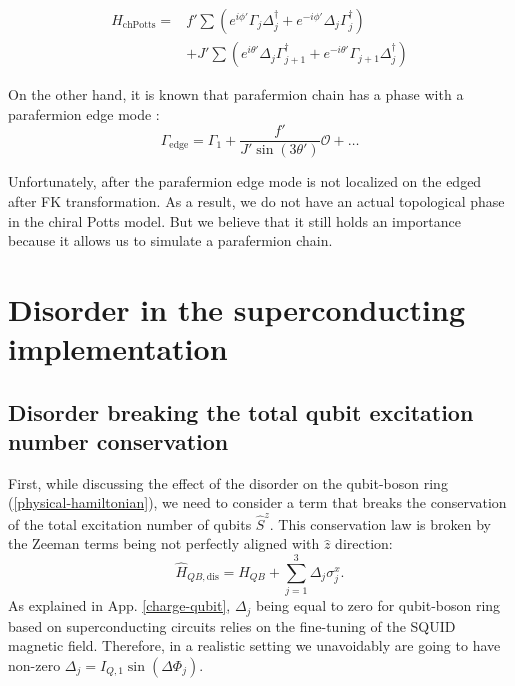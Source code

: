 \documentclass[reprint, aps, prx, amsmath, amssymb, longbibliography, superscriptaddress]{revtex4-2}
\begin{document}
\begin{equation}
\begin{aligned}
    H_{\text{chPotts}} = &f' \sum \left( e^{i\phi'} \Gamma_j \Delta_j^{\dagger} + e^{-i\phi'} \Delta_j \Gamma_j^{\dagger}\right) \\
    &+J' \sum \left(e^{i\theta'} \Delta_j \Gamma_{j+1}^{\dagger} + e^{-i\theta'} \Gamma_{j+1} \Delta_j^{\dagger}\right)
\end{aligned}
\end{equation}



On the other hand, it is known that parafermion chain has a phase with a parafermion edge mode  \cite{fendley_parafermionic_2012}:
\begin{equation}
\Gamma_{\text{edge}} = \Gamma_1 + \frac{f'}{J' \sin(3\theta')} \mathcal{O} + \dots
\end{equation}

Unfortunately, after the parafermion edge mode is not localized on the edged after FK transformation. As a result, we do not have an actual topological phase in the chiral Potts model. But we believe that it still holds an importance because it allows us to simulate a parafermion chain.


\section{Disorder in the superconducting implementation}
\subsection{Disorder breaking the total qubit excitation number conservation}


First, while discussing the effect of the disorder on the qubit-boson ring (\ref{physical-hamiltonian}), we need to consider a term that breaks the conservation of the total excitation number of qubits $\hat S^z$. This conservation law is broken by the Zeeman terms being not perfectly aligned with $\hat z$ direction:
\begin{equation}
    \hat H_{QB,\text{dis}} = \hat H_{QB} + \sum_{j=1}^3 \Delta_j \sigma_j^x.
\end{equation}
As explained in App. \ref{charge-qubit}, $\Delta_j$ being equal to zero for qubit-boson ring based on superconducting circuits relies on the fine-tuning of the SQUID magnetic field. Therefore, in a realistic setting we unavoidably are going to have non-zero $\Delta_j = I_{Q,1}\sin(\Delta \Phi_j)$.
\end{document}
